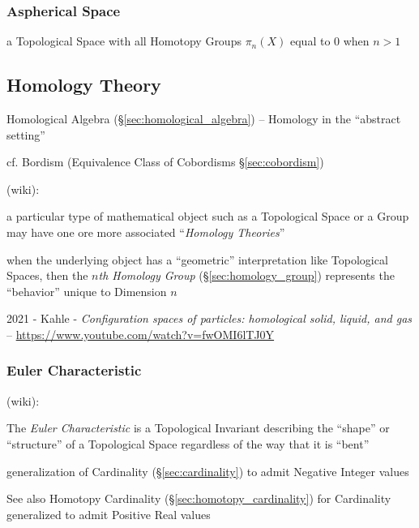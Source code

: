 \subsubsection{Aspherical Space}\label{sec:aspherical_space}

a Topological Space with all Homotopy Groups $\pi_n(X)$ equal to $0$ when $n >
1$



\subsection{Homology Theory}\label{sec:homology_theory}

\fist Homological Algebra (\S\ref{sec:homological_algebra}) -- Homology in the
``abstract setting''

cf. Bordism (Equivalence Class of Cobordisms \S\ref{sec:cobordism})

(wiki):

a particular type of mathematical object such as a Topological Space or a
Group may have one ore more associated ``\emph{Homology Theories}''

when the underlying object has a ``geometric'' interpretation like Topological
Spaces, then the \emph{$n$th Homology Group} (\S\ref{sec:homology_group})
represents the ``behavior'' unique to Dimension $n$

2021 - Kahle -
\emph{Configuration spaces of particles: homological solid, liquid, and gas}
-- \url{https://www.youtube.com/watch?v=fwOMI6lTJ0Y}



\subsubsection{Euler Characteristic}\label{sec:euler_characteristic}

(wiki):

The \emph{Euler Characteristic} is a Topological Invariant describing the
``shape'' or ``structure'' of a Topological Space regardless of the way that it
is ``bent''

generalization of Cardinality (\S\ref{sec:cardinality}) to admit
Negative Integer values

\fist See also Homotopy Cardinality (\S\ref{sec:homotopy_cardinality})
for Cardinality generalized to admit Positive Real values

